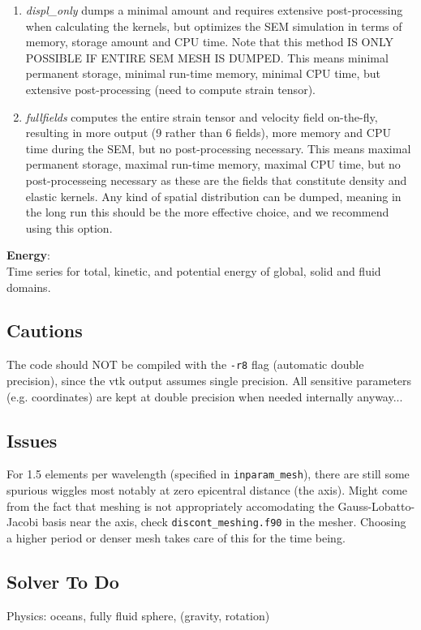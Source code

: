 \documentclass[11pt,letter,fleqn,english,notitlepage]{article}
\begin{document}
\begin{enumerate}
    \item \textit{displ\_only} dumps a minimal amount and requires extensive
    post-processing when calculating the kernels, but optimizes the SEM simulation
    in terms of memory, storage amount and CPU time.  Note that this method IS ONLY
    POSSIBLE IF ENTIRE SEM MESH IS DUMPED.  This means minimal permanent storage,
    minimal run-time memory, minimal CPU time, but extensive post-processing (need
    to compute strain tensor).
    
    \item \textit{fullfields} computes the entire strain tensor and velocity 
    field on-the-fly, resulting in more output (9 rather than 6 fields), 
    more memory and CPU time during the SEM, but no post-processing necessary. 
    This means maximal permanent storage, maximal run-time memory, maximal CPU time, 
    but no post-processeing necessary as these are the fields that 
    constitute density and elastic kernels.
    Any kind of spatial distribution can be dumped, meaning in the long run 
    this should be the more effective choice, and we recommend using this option.
\end{enumerate}

\noindent \textbf{Energy}: \\
Time series for total, kinetic, and potential energy of global, solid and fluid
domains.

\subsection{Cautions}
The code should NOT be compiled with the {\tt -r8} flag (automatic double
precision), since the vtk output assumes single precision. All sensitive
parameters (e.g. coordinates) are kept at double precision when needed
internally anyway...

\subsection{Issues}
For 1.5 elements per wavelength (specified in {\tt inparam\_mesh}), there are
still some spurious wiggles most notably at zero epicentral distance (the
axis). Might come from the fact that meshing is not appropriately accomodating
the Gauss-Lobatto-Jacobi basis near the axis, check {\tt discont\_meshing.f90}
in the mesher.  Choosing a higher period or denser mesh takes care of this for
the time being.

\subsection{Solver To Do}
\noindent Physics: oceans, fully fluid sphere, (gravity, rotation)\\
\end{document}
